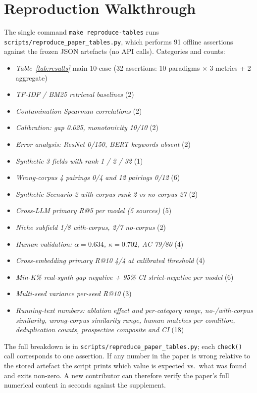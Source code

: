 \documentclass[11pt]{article}
\newcommand{\fpath}[1]{\mbox{}\nolinkurl{#1}}
\begin{document}
\section{Reproduction Walkthrough}\label{app:repro}

The single command \texttt{make reproduce-tables} runs \fpath{scripts/reproduce_paper_tables.py}, which performs 91 offline assertions against the frozen JSON artefacts (no API calls). Categories and counts:

\begin{itemize}[leftmargin=*,nosep]
\item \emph{Table~\ref{tab:results}} main 10-case (32 assertions: 10 paradigms $\times$ 3 metrics + 2 aggregate)
\item \emph{TF-IDF / BM25 retrieval baselines} (2)
\item \emph{Contamination Spearman correlations} (2)
\item \emph{Calibration: gap 0.025, monotonicity 10/10} (2)
\item \emph{Error analysis: ResNet 0/150, BERT keywords absent} (2)
\item \emph{Synthetic 3 fields with rank 1 / 2 / 32} (1)
\item \emph{Wrong-corpus 4 pairings 0/4 and 12 pairings 0/12} (6)
\item \emph{Synthetic Scenario-2 with-corpus rank 2 vs no-corpus 27} (2)
\item \emph{Cross-LLM primary R@5 per model (5 sources)} (5)
\item \emph{Niche subfield 1/8 with-corpus, 2/7 no-corpus} (2)
\item \emph{Human validation: $\alpha{=}0.634$, $\kappa{=}0.702$, AC 79/80} (4)
\item \emph{Cross-embedding primary R@10 4/4 at calibrated threshold} (4)
\item \emph{Min-K\% real-synth gap negative + 95\% CI strict-negative per model} (6)
\item \emph{Multi-seed variance per-seed R@10} (3)
\item \emph{Running-text numbers: ablation effect and per-category range, no-/with-corpus similarity, wrong-corpus similarity range, human matches per condition, deduplication counts, prospective composite and CI} (18)
\end{itemize}

The full breakdown is in \fpath{scripts/reproduce_paper_tables.py}; each \texttt{check()} call corresponds to one assertion. If any number in the paper is wrong relative to the stored artefact the script prints which value is expected vs.\ what was found and exits non-zero. A new contributor can therefore verify the paper's full numerical content in seconds against the supplement.
\end{document}
